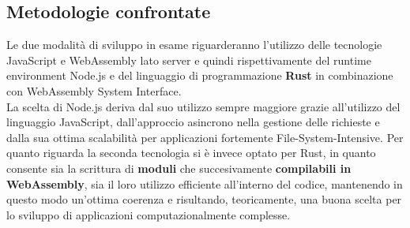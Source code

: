 \subsection{Metodologie confrontate}
Le due modalità di sviluppo in esame riguarderanno l'utilizzo delle tecnologie JavaScript e WebAssembly lato server e quindi rispettivamente del runtime environment Node.js e del linguaggio di programmazione \textbf{Rust} in combinazione con WebAssembly System Interface. 
\\La scelta di Node.js deriva dal suo utilizzo sempre maggiore grazie all'utilizzo del linguaggio JavaScript, dall'approccio asincrono nella gestione delle richieste e dalla sua ottima scalabilità per applicazioni fortemente File-System-Intensive.
Per quanto riguarda la seconda tecnologia si è invece optato per Rust, in quanto consente sia la scrittura di \textbf{moduli} che succesivamente \textbf{compilabili in WebAssembly}, sia il loro utilizzo efficiente all'interno del codice, mantenendo in questo modo un'ottima coerenza e risultando, teoricamente, una buona scelta per lo sviluppo di applicazioni computazionalmente complesse. 

